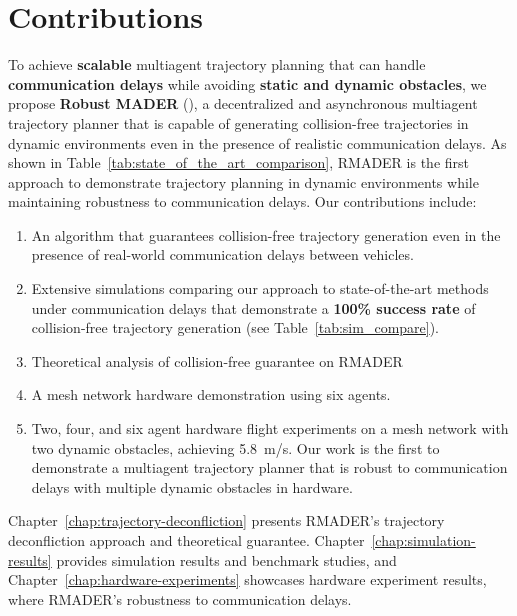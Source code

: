 \section{Contributions}

To achieve \textbf{scalable} multiagent trajectory planning that can handle \textbf{communication delays} while avoiding \textbf{static and dynamic obstacles}, we propose \textbf{Robust MADER} (\RMADER{}), a decentralized and asynchronous multiagent trajectory planner that is capable of generating collision-free trajectories in dynamic environments even in the presence of realistic communication delays.
As shown in Table~\ref{tab:state_of_the_art_comparison}, RMADER is the first approach to demonstrate trajectory planning in dynamic environments while maintaining robustness to communication delays. Our contributions include:
\begin{enumerate}
  \item An algorithm that guarantees collision-free trajectory generation even in the presence of real-world communication delays between vehicles. 
  \item Extensive simulations comparing our approach to state-of-the-art methods under communication delays that demonstrate a \textbf{100\% success rate} of collision-free trajectory generation (see Table~\ref{tab:sim_compare}).
  \item Theoretical analysis of collision-free guarantee on RMADER
  \item A mesh network hardware demonstration using six agents. 
  \item Two, four, and six agent hardware flight experiments on a mesh network with two dynamic obstacles, achieving \SI{5.8}{\m/\s}. Our work is the first to demonstrate a multiagent trajectory planner that is robust to communication delays with multiple dynamic obstacles in hardware.
\end{enumerate}

Chapter~\ref{chap:trajectory-deconfliction} presents RMADER's trajectory deconfliction approach and theoretical guarantee. Chapter~\ref{chap:simulation-results} provides simulation results and benchmark studies, and Chapter~\ref{chap:hardware-experiments} showcases hardware experiment results, where RMADER's robustness to communication delays.
